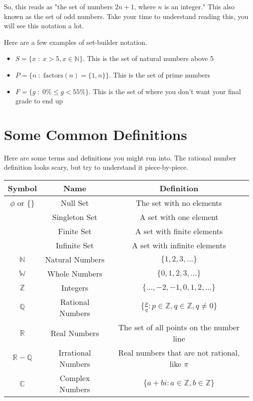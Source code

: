 So, this reads as "the set of numbers $2n+1$, where $n$ is an integer." This also known as the set of odd numbers. Take your time to understand reading this, you will see this notation a lot.

\myexample
{
	Here are a few examples of set-builder notation.
	\begin{itemize}
		\item $S = \{x \;:\; x > 5, x \in \mathbb{N}\}$. This is the set of natural numbers above 5
		\item $P = \{n \;:\; \text{factors}(n) = \{1,n\}\}$. This is the set of prime numbers
		\item $F = \{g \;:\; 0\% \leq g < 55\%\}$. This is the set of where you don't want your final grade to end up
	\end{itemize}
}
	
\section{Some Common Definitions}

Here are some terms and definitions you might run into. The rational number definition looks scary, but try to understand it piece-by-piece.

\begin{tabular}{|c|c|c|}
\hline
Symbol & Name & Definition\\
\hline
$\phi$ or $\{\}$ & Null Set & The set with no elements\\
 & Singleton Set & A set with one element\\
 & Finite Set & A set with finite elements\\
 & Infinite Set & A set with infinite elements\\
$\mathbb{N}$ & Natural Numbers & $\{1,2,3,\dots\}$\\
$\mathbb{W}$ & Whole Numbers & $\{0,1,2,3,\dots\}$\\
$\mathbb{Z}$ & Integers & $\{\dots, -2, -1, 0, 1, 2, \dots\}$\\
$\mathbb{Q}$ & Rational Numbers &
$\displaystyle \bigg\{ \frac{p}{q} : p \in \mathbb{Z}, q \in \mathbb{Z}, q \neq 0 \bigg\}$\\
$\mathbb{R}$ & Real Numbers & The set of all points on the number line\\
$\mathbb{R}-\mathbb{Q}$ & Irrational Numbers & Real numbers that are not rational, like $\pi$\\
$\mathbb{C}$ & Complex Numbers & $\{a+bi : a \in \mathbb{Z}, b \in \mathbb{Z}\}$\\
\hline
\end{tabular}

